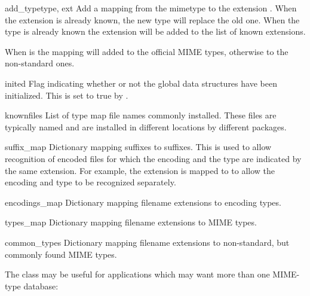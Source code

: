 \begin{funcdesc}{add_type}{type, ext}
Add a mapping from the mimetype  to the extension .
When the extension is already known, the new type will replace the old
one. When the type is already known the extension will be added
to the list of known extensions.

When  is the mapping will added to the official
MIME types, otherwise to the non-standard ones.
\end{funcdesc}


\begin{datadesc}{inited}
Flag indicating whether or not the global data structures have been
initialized.  This is set to true by .
\end{datadesc}

\begin{datadesc}{knownfiles}
List of type map file names commonly installed.  These files are
typically named  and are installed in different
locations by different packages.
\end{datadesc}

\begin{datadesc}{suffix_map}
Dictionary mapping suffixes to suffixes.  This is used to allow
recognition of encoded files for which the encoding and the type are
indicated by the same extension.  For example, the 
extension is mapped to  to allow the encoding and type
to be recognized separately.
\end{datadesc}

\begin{datadesc}{encodings_map}
Dictionary mapping filename extensions to encoding types.
\end{datadesc}

\begin{datadesc}{types_map}
Dictionary mapping filename extensions to MIME types.
\end{datadesc}

\begin{datadesc}{common_types}
Dictionary mapping filename extensions to non-standard, but commonly
found MIME types.
\end{datadesc}


The  class may be useful for applications which may
want more than one MIME-type database:

